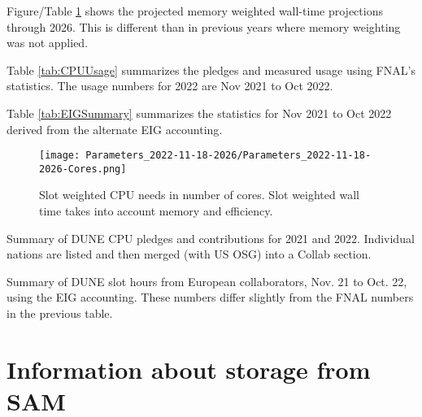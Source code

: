 \documentclass[12pt]{article}
\begin{document}
Figure/Table \ref{fig:CoresMain} shows the projected memory weighted wall-time projections through 2026.  This is different than in previous years where memory weighting was not applied. 

Table \ref{tab:CPUUsage} summarizes the pledges\cite{CCB2022} and measured usage using FNAL's statistics\cite{fifemonDUNE}.  The  usage numbers for 2022 are Nov 2021 to Oct 2022. 

Table \ref{tab:EIGSummary} summarizes the statistics for Nov 2021 to Oct 2022 derived from the alternate EIG accounting\cite{EIG2022}.  

\begin{figure}[h]
\centering\texttt{[image: Parameters\_2022-11-18-2026/Parameters\_2022-11-18-2026-Cores.png]}
\caption{Slot weighted CPU needs in number of cores. Slot weighted wall time takes into account memory and efficiency.}\label{fig:CoresMain}
\end{figure}

\begin{table}[ht]
\centering{}
\caption{Summary  of DUNE CPU pledges and contributions for 2021 and 2022.  Individual nations are listed and then merged (with US OSG) into a Collab section.  } \label{tab:CPUUsage}
\end{table}

\begin{table}[ht]
\centering{}
\caption{Summary  of DUNE slot hours from European collaborators, Nov. 21 to Oct. 22, using the EIG accounting\cite{EIG2022}. These numbers differ slightly from the FNAL numbers in the previous table.} \label{tab:EIGSummary}
\end{table}


%



\clearpage
\appendix

\section{Information about storage from SAM}\label{storage}
\end{document}

